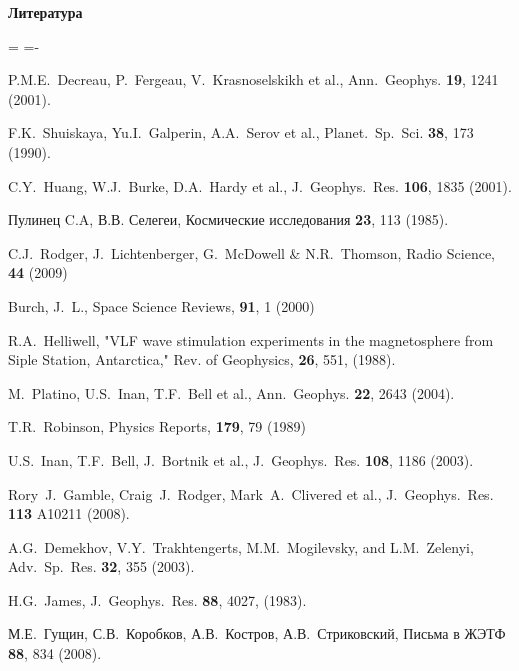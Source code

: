 \documentclass[autoref,10pt]{disser}
\newcounter{enumv}
\renewcommand{\theenumv}{\arabic{enumv}}
\newenvironment{theotherbib1}[1][.]
{\begin{list}{\theenumv#1\hspace{5pt}}{
\begin{center}\bf\large Литература \end{center}
\usecounter{enumv}
\topsep=0pt\labelsep=2pt\itemsep=0pt\itemindent=\parindent
\listparindent=-\parindent}}
{\end{list}}
\begin{document}
\begin{theotherbib1}
\item P.M.E.~Decreau, P.~Fergeau, V.~Krasnoselskikh et al., Ann.~Geophys. {\bf 19}, 1241 (2001).\label{WHISPER}

\item F.K.~Shuiskaya, Yu.I.~Galperin, A.A.~Serov et al., Planet.~Sp.~Sci. {\bf 38}, 173 (1990).\label{Galperin}

\item C.Y.~Huang, W.J.~Burke, D.A.~Hardy et al., J.~Geophys.~Res. {\bf 106}, 1835 (2001).\label{Huang}
\item Пулинец C.A, В.В. Селегеи, Космические исследования {\bf 23}, 113 (1985).\label{Pulinets}

\item C.J.~Rodger,  J.~Lichtenberger, G.~McDowell \& N.R.~Thomson, Radio Science, {\bf 44} (2009)\label{AWD}

\item Burch, J.~L., Space Science Reviews, {\bf 91}, 1 (2000)\label{IMAGE}

\item R.A.~Helliwell, "VLF wave stimulation experiments in the magnetosphere from Siple Station, Antarctica," Rev. of Geophysics, {\bf 26}, 551, (1988).\label{SPBEACON}

\item M.~Platino, U.S.~Inan, T.F.~Bell et al., Ann.~Geophys. {\bf 22}, 2643 (2004).\label{HAARP}

\item T.R.~Robinson, Physics Reports, {\bf 179}, 79 (1989)\label{EISCAT}

\item U.S.~Inan, T.F.~Bell, J.~Bortnik et al., J.~Geophys.~Res. {\bf 108}, 1186 (2003).\label{InanBellBortnik}

\item Rory~J.~Gamble, Craig~J.~Rodger, Mark~A.~Clivered et al., J.~Geophys.~Res. {\bf 113} A10211 (2008).\label{Rory}

\item A.G.~Demekhov, V.Y.~Trakhtengerts, M.M.~Mogilevsky, and L.M.~Zelenyi, Adv.~Sp.~Res. {\bf 32}, 355 (2003).\label{Demekhov}

\item H.G.~James, J.~Geophys.~Res. {\bf 88}, 4027, (1983).\label{James}

\item М.Е.~Гущин, С.В.~Коробков, А.В.~Костров, А.В.~Стриковский, Письма в ЖЭТФ {\bf 88}, 834 (2008).\label{Gushchin}


\end{theotherbib1}
\end{document}
